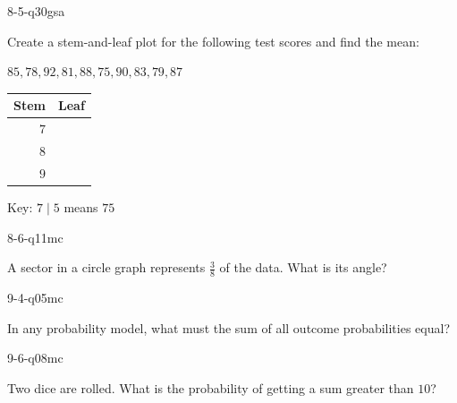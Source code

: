 \begin{practiceQuestion}{8-5-q30}{gsa}
\begin{questionText}
Create a stem-and-leaf plot for the following test scores and find the mean:

$85, 78, 92, 81, 88, 75, 90, 83, 79, 87$

\begin{center}
\begin{tabular}{r|l}
\textbf{Stem} & \textbf{Leaf} \\
\hline
$7$ & \\
$8$ & \\
$9$ & \\
\end{tabular}

Key: $7 \mid 5$ means $75$
\end{center}
\end{questionText}
\end{practiceQuestion}

\begin{practiceQuestion}{8-6-q11}{mc}
\begin{questionText}
A sector in a circle graph represents $\frac{3}{8}$ of the data. What is its angle?
\end{questionText}
\end{practiceQuestion}

\begin{practiceQuestion}{9-4-q05}{mc}
\begin{questionText}
In any probability model, what must the sum of all outcome probabilities equal?
\end{questionText}
\end{practiceQuestion}

\begin{practiceQuestion}{9-6-q08}{mc}
\begin{questionText}
Two dice are rolled. What is the probability of getting a sum greater than $10$?
\end{questionText}
\end{practiceQuestion}

